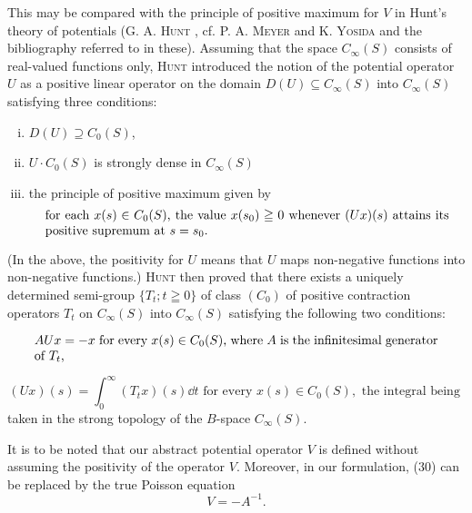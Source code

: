 This may be compared with the principle of positive maximum for $V$ in Hunt's theory of potentials (G. A. \textsc{Hunt} \cite{hunt119}, cf. P. A. \textsc{Meyer} \cite{meyer194} and K. \textsc{Yosida} \cite{yosida375} and the bibliography referred to in these). Assuming that the space $C_{\infty}(S)$ consists of real-valued functions only, \textsc{Hunt} introduced the notion of the potential operator $U$ as a positive linear operator on the domain $D(U) \subseteq C_{\infty}(S)$ into $C_{\infty}(S)$ satisfying three conditions: \begin{enumerate}[i)]
\item $D(U) \supseteq C_0(S)$,
\item $U \cdot C_0(S)$ is strongly dense in $C_{\infty}(S)$
\item the principle of positive maximum given by 
\begin{equation}\label{eq:XIII.9.29}
\parbox{0.92\linewidth}{\everymath{}\let\limits\nolimits for each $x(s) \in C_0(S)$, the value $x(s_0) \geqq 0$ whenever $(U x)(s)$ attains its positive supremum at $s = s_{0}$.}
\end{equation}
\end{enumerate}



(In the above, the positivity for $U$ means that $U$ maps non-negative functions into non-negative functions.) \textsc{Hunt} then proved that there exists a uniquely determined semi-group $\{T_{t}; t \geqq 0\}$ of class $(C_{0})$ of positive contraction operators $T_{t}$ on $C_{\infty}(S)$ into $C_{\infty}(S)$ satisfying the following two conditions: 

\begin{equation}\label{eq:XIII.9.30}
\parbox{0.92\linewidth}{\everymath{}\let\limits\nolimits $A U x = -x$ for every $x(s) \in C_{0}(S)$, where $A$ is the infinitesimal generator of $T_{t}$,}
\end{equation}

\begin{equation}\label{eq:XIII.9.31}
(U x) (s) = \int_{0} ^{\infty} \left(T _{t} x\right) (s) \dd t \text{ for every } x (s) \in C _{0} (S), \text{ the integral being }
\end{equation}
taken in the strong topology of the $B$-space $C_{\infty}(S)$. 

It is to be noted that our abstract potential operator $V$ is defined without assuming the positivity of the operator $V$. Moreover, in our formulation, ($30$) can be replaced by the true Poisson equation 
\begin{equation}\tag{30'}\label{eq:XIII.9.30'}
V = - A ^{-1}.
\end{equation}


